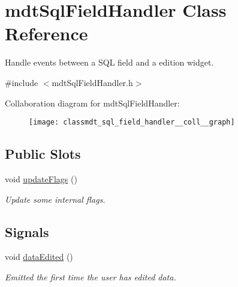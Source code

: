 \hypertarget{classmdt_sql_field_handler}{
\section{mdtSqlFieldHandler Class Reference}
\label{classmdt_sql_field_handler}
}


Handle events between a SQL field and a edition widget.  




{\ttfamily \#include $<$mdtSqlFieldHandler.h$>$}



Collaboration diagram for mdtSqlFieldHandler:\nopagebreak
\begin{figure}[H]
\begin{center}
\leavevmode
\texttt{[image: classmdt\_sql\_field\_handler\_\_coll\_\_graph]}
\end{center}
\end{figure}
\subsection*{Public Slots}
\begin{DoxyCompactItemize}
\item 
void \hyperlink{classmdt_sql_field_handler_a7bb4e75ab209bdd2609cf458b5ce8868}{updateFlags} ()
\begin{DoxyCompactList}\small\item\em Update some internal flags. \end{DoxyCompactList}\end{DoxyCompactItemize}
\subsection*{Signals}
\begin{DoxyCompactItemize}
\item 
\hypertarget{classmdt_sql_field_handler_a111eebc8905151a5938950e23e61ff90}{
void \hyperlink{classmdt_sql_field_handler_a111eebc8905151a5938950e23e61ff90}{dataEdited} ()}
\label{classmdt_sql_field_handler_a111eebc8905151a5938950e23e61ff90}

\begin{DoxyCompactList}\small\item\em Emitted the first time the user has edited data. \end{DoxyCompactList}\end{DoxyCompactItemize}
